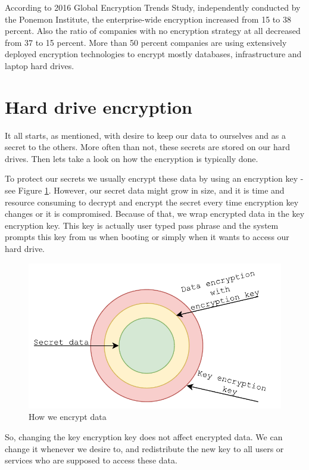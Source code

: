 \documentclass[../xdudla00-porting-Tang-to-Open-WRT.tex]{subfiles}
\begin{document}
According to 2016 Global Encryption Trends Study, independently conducted by the Ponemon Institute\cite{Thales}, the enterprise-wide encryption increased from 15 to 38 percent.
Also the ratio of companies with no encryption strategy at all decreased from 37 to 15 percent. 
More than 50 percent companies are using extensively deployed encryption technologies to encrypt mostly databases, infrastructure and laptop hard drives. 

\section{Hard drive encryption}

It all starts, as mentioned, with desire to keep our data to ourselves and as a secret to the others.
More often than not, these secrets are stored on our hard drives.
Then lets take a look on how the encryption is typically done.

To protect our secrets we usually encrypt these data by using an encryption key - see Figure \ref{fig:encdata}.
However, our secret data might grow in size, and it is time and resource consuming to decrypt and encrypt the secret every time encryption key changes or it is compromised.
Because of that, we wrap encrypted data in the key encryption key. 
This key is actually user typed pass phrase and the system prompts this key from us when booting or simply when it wants to access our hard drive.

\begin{figure}[h]
    \centering
    \includegraphics[scale=0.7]{figures/HowWeEncryptData.pdf}
    \caption{How we encrypt data}
    \label{fig:encdata}
\end{figure}

So, changing the key encryption key does not affect encrypted data.
We can change it whenever we desire to, and redistribute the new key to all users or services who are supposed to access these data.
\end{document}
